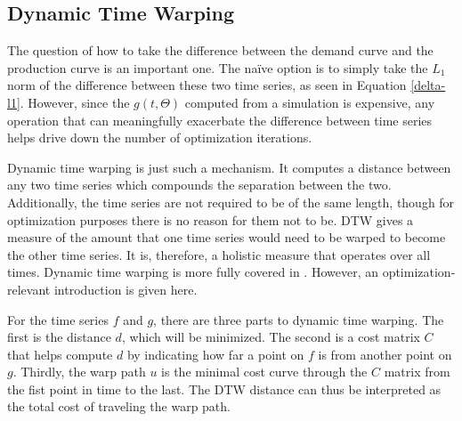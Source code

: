 \subsection{Dynamic Time Warping}
\label{dtw}

The question of how to take the difference between the demand curve and 
the production curve is an important one. The na\"ive option is to simply 
take the $L_1$ norm of the difference between these two time series, as 
seen in Equation \ref{delta-l1}.  However, since the $g(t, \Theta)$ computed
from a simulation is expensive, any operation that can meaningfully 
exacerbate the difference between time series helps drive down the number 
of optimization iterations.

Dynamic time warping is just such a mechanism. It computes 
a distance between any two time series which compounds the separation 
between the two. Additionally, the time series are not required to be of the 
same length, though for optimization purposes there is no reason for them 
not to be. DTW gives a measure of the amount that one time series would need to 
be warped to become the other time series. It is, therefore, a holistic  
measure that operates over all times. Dynamic time warping
is more fully covered in \cite{muller}.  However, an 
optimization-relevant introduction is given here.

For the time series $f$ and $g$, there are three parts to dynamic time 
warping. The first is the distance $d$, which will be minimized. The second 
is a cost matrix $C$ that helps compute $d$ by indicating how far a point 
on $f$ is from another point on $g$. Thirdly, the warp path $u$ is the 
minimal cost curve through the $C$ matrix from the fist point in time to 
the last. The DTW distance can thus be interpreted as the 
total cost of traveling the warp path.


